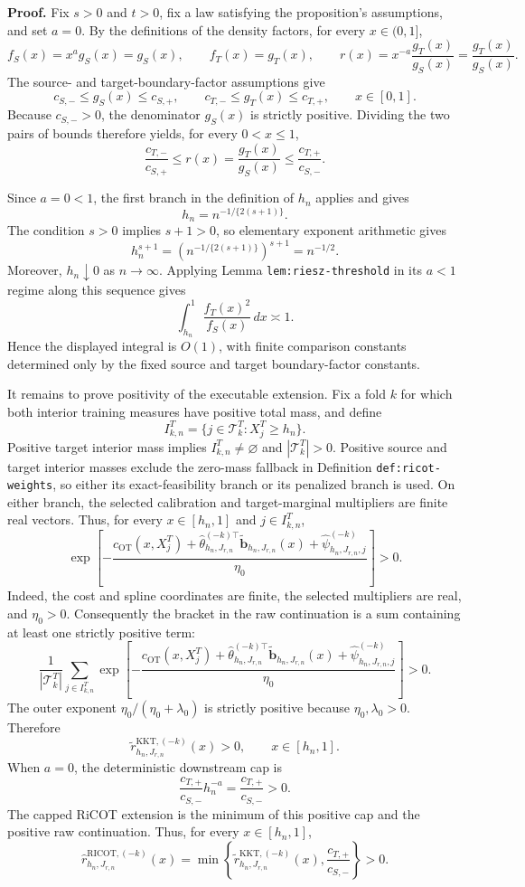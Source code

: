 \textbf{Proof.}
Fix \(s>0\) and \(t>0\), fix a law satisfying the proposition's assumptions, and set \(a=0\). By the definitions of the density factors, for every \(x\in(0,1]\),
\[
f_S(x)=x^a g_S(x)=g_S(x),
\qquad
f_T(x)=g_T(x),
\qquad
r(x)=x^{-a}\frac{g_T(x)}{g_S(x)}=\frac{g_T(x)}{g_S(x)}.
\]
The source- and target-boundary-factor assumptions give
\[
c_{S,-}\le g_S(x)\le c_{S,+},
\qquad
c_{T,-}\le g_T(x)\le c_{T,+},
\qquad x\in[0,1].
\]
Because \(c_{S,-}>0\), the denominator \(g_S(x)\) is strictly positive. Dividing the two pairs of bounds therefore yields, for every \(0<x\le1\),
\[
\frac{c_{T,-}}{c_{S,+}}
\le r(x)=\frac{g_T(x)}{g_S(x)}
\le \frac{c_{T,+}}{c_{S,-}}.
\]

Since \(a=0<1\), the first branch in the definition of \(h_n\) applies and gives
\[
h_n=n^{-1/\{2(s+1)\}}.
\]
The condition \(s>0\) implies \(s+1>0\), so elementary exponent arithmetic gives
\[
h_n^{s+1}
=\left(n^{-1/\{2(s+1)\}}\right)^{s+1}
=n^{-1/2}.
\]
Moreover, \(h_n\downarrow0\) as \(n\to\infty\). Applying Lemma \texttt{lem:riesz-threshold} in its \(a<1\) regime along this sequence gives
\[
\int_{h_n}^1\frac{f_T(x)^2}{f_S(x)}\,dx\asymp1.
\]
Hence the displayed integral is \(O(1)\), with finite comparison constants determined only by the fixed source and target boundary-factor constants.

It remains to prove positivity of the executable extension. Fix a fold \(k\) for which both interior training measures have positive total mass, and define
\[
I^T_{k,n}=\{j\in\mathcal T^T_k:X_j^T\ge h_n\}.
\]
Positive target interior mass implies \(I^T_{k,n}\ne\varnothing\) and \(|\mathcal T^T_k|>0\). Positive source and target interior masses exclude the zero-mass fallback in Definition \texttt{def:ricot-weights}, so either its exact-feasibility branch or its penalized branch is used. On either branch, the selected calibration and target-marginal multipliers are finite real vectors. Thus, for every \(x\in[h_n,1]\) and \(j\in I^T_{k,n}\),
\[
\exp\!\left[-\frac{c_{\mathrm{OT}}(x,X_j^T)
+\widehat\theta_{h_n,J_{r,n}}^{(-k)\top}
\widetilde{\mathbf b}_{h_n,J_{r,n}}(x)
+\widehat\psi^{(-k)}_{h_n,J_{r,n},j}}{\eta_0}\right]>0.
\]
Indeed, the cost and spline coordinates are finite, the selected multipliers are real, and \(\eta_0>0\). Consequently the bracket in the raw continuation is a sum containing at least one strictly positive term:
\[
\frac{1}{|\mathcal T^T_k|}
\sum_{j\in I^T_{k,n}}
\exp\!\left[-\frac{c_{\mathrm{OT}}(x,X_j^T)
+\widehat\theta_{h_n,J_{r,n}}^{(-k)\top}
\widetilde{\mathbf b}_{h_n,J_{r,n}}(x)
+\widehat\psi^{(-k)}_{h_n,J_{r,n},j}}{\eta_0}\right]>0.
\]
The outer exponent \(\eta_0/(\eta_0+\lambda_0)\) is strictly positive because \(\eta_0,\lambda_0>0\). Therefore
\[
\widetilde r^{\mathrm{KKT},(-k)}_{h_n,J_{r,n}}(x)>0,
\qquad x\in[h_n,1].
\]
When \(a=0\), the deterministic downstream cap is
\[
\frac{c_{T,+}}{c_{S,-}}h_n^{-a}=\frac{c_{T,+}}{c_{S,-}}>0.
\]
The capped RiCOT extension is the minimum of this positive cap and the positive raw continuation. Thus, for every \(x\in[h_n,1]\),
\[
\widehat r^{\mathrm{RICOT},(-k)}_{h_n,J_{r,n}}(x)
=\min\!\left\{
\widetilde r^{\mathrm{KKT},(-k)}_{h_n,J_{r,n}}(x),
\frac{c_{T,+}}{c_{S,-}}
\right\}>0.
\]

